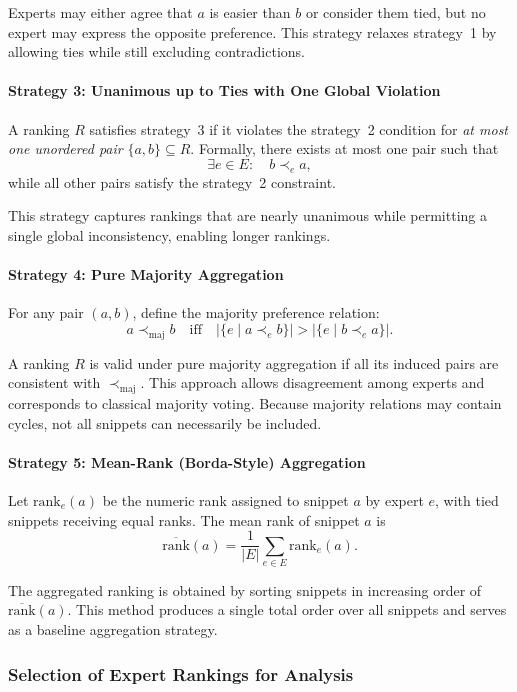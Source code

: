 Experts may either agree that \( a \) is easier than \( b \) or consider them tied, but no expert may express the opposite preference.
This strategy relaxes strategy~1 by allowing ties while still excluding contradictions.

\paragraph{Strategy 3: Unanimous up to Ties with One Global Violation}
A ranking \( R \) satisfies strategy~3 if it violates the strategy~2 condition for \emph{at most one unordered pair} \( \{a,b\} \subseteq R \).
Formally, there exists at most one pair such that
\[
\exists e \in E:\quad b \prec_e a,
\]
while all other pairs satisfy the strategy~2 constraint.

This strategy captures rankings that are nearly unanimous while permitting a single global inconsistency, enabling longer rankings.

\paragraph{Strategy 4: Pure Majority Aggregation}
For any pair \( (a,b) \), define the majority preference relation:
\[
a \prec_{\text{maj}} b
\quad \text{iff} \quad
|\{e \mid a \prec_e b\}| > |\{e \mid b \prec_e a\}|.
\]

A ranking \( R \) is valid under pure majority aggregation if all its induced pairs are consistent with \( \prec_{\text{maj}} \).
This approach allows disagreement among experts and corresponds to classical majority voting.
Because majority relations may contain cycles, not all snippets can necessarily be included.

\paragraph{Strategy 5: Mean-Rank (Borda-Style) Aggregation}
Let \( \text{rank}_e(a) \) be the numeric rank assigned to snippet \( a \) by expert \( e \), with tied snippets receiving equal ranks.
The mean rank of snippet \( a \) is
\[
\overline{\text{rank}}(a) = \frac{1}{|E|} \sum_{e \in E} \text{rank}_e(a).
\]

The aggregated ranking is obtained by sorting snippets in increasing order of \( \overline{\text{rank}}(a) \).
This method produces a single total order over all snippets and serves as a baseline aggregation strategy.

\subsubsection{Selection of Expert Rankings for Analysis}

